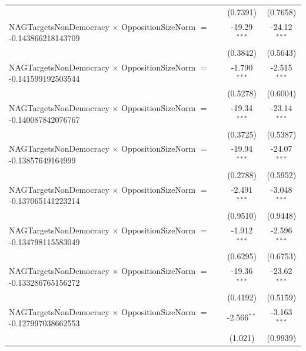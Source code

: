 \begin{tabular}{lcc}
                                                                                & (0.7391)             & (0.7658)\\   
   NAGTargetsNonDemocracy $\times$ OppositionSizeNorm $=$ -0.143866218143709    & -19.29$^{***}$       & -24.12$^{***}$\\   
                                                                                & (0.3842)             & (0.5643)\\   
   NAGTargetsNonDemocracy $\times$ OppositionSizeNorm $=$ -0.141599192503544    & -1.790$^{***}$       & -2.515$^{***}$\\   
                                                                                & (0.5278)             & (0.6004)\\   
   NAGTargetsNonDemocracy $\times$ OppositionSizeNorm $=$ -0.140087842076767    & -19.34$^{***}$       & -23.14$^{***}$\\   
                                                                                & (0.3725)             & (0.5387)\\   
   NAGTargetsNonDemocracy $\times$ OppositionSizeNorm $=$ -0.13857649164999     & -19.94$^{***}$       & -24.07$^{***}$\\   
                                                                                & (0.2788)             & (0.5952)\\   
   NAGTargetsNonDemocracy $\times$ OppositionSizeNorm $=$ -0.137065141223214    & -2.491$^{***}$       & -3.048$^{***}$\\   
                                                                                & (0.9510)             & (0.9448)\\   
   NAGTargetsNonDemocracy $\times$ OppositionSizeNorm $=$ -0.134798115583049    & -1.912$^{***}$       & -2.596$^{***}$\\   
                                                                                & (0.6295)             & (0.6753)\\   
   NAGTargetsNonDemocracy $\times$ OppositionSizeNorm $=$ -0.133286765156272    & -19.36$^{***}$       & -23.62$^{***}$\\   
                                                                                & (0.4192)             & (0.5159)\\   
   NAGTargetsNonDemocracy $\times$ OppositionSizeNorm $=$ -0.127997038662553    & -2.566$^{**}$        & -3.163$^{***}$\\   
                                                                                & (1.021)              & (0.9939)\\   

\end{tabular}

